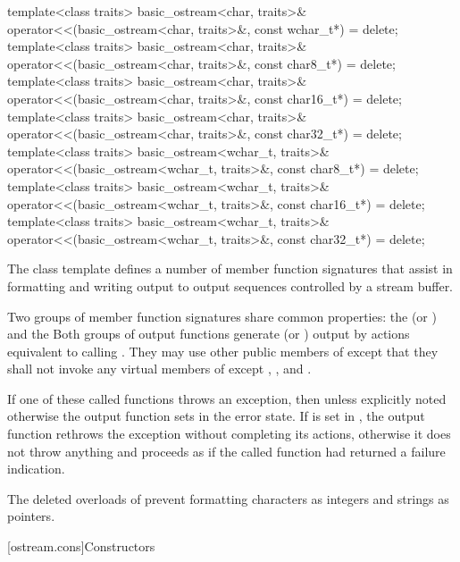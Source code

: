 \begin{codeblock}
{  template<class traits>
    basic_ostream<char, traits>&
      operator<<(basic_ostream<char, traits>&, const wchar_t*) = delete;
  template<class traits>
    basic_ostream<char, traits>&
      operator<<(basic_ostream<char, traits>&, const char8_t*) = delete;
  template<class traits>
    basic_ostream<char, traits>&
      operator<<(basic_ostream<char, traits>&, const char16_t*) = delete;
  template<class traits>
    basic_ostream<char, traits>&
      operator<<(basic_ostream<char, traits>&, const char32_t*) = delete;
  template<class traits>
    basic_ostream<wchar_t, traits>&
      operator<<(basic_ostream<wchar_t, traits>&, const char8_t*) = delete;
  template<class traits>
    basic_ostream<wchar_t, traits>&
      operator<<(basic_ostream<wchar_t, traits>&, const char16_t*) = delete;
  template<class traits>
    basic_ostream<wchar_t, traits>&
      operator<<(basic_ostream<wchar_t, traits>&, const char32_t*) = delete;
}
\end{codeblock}

\pnum
The class template
defines a number of member function
signatures that assist in formatting and writing output to output sequences
controlled by a stream buffer.

\pnum
Two groups of member function signatures share common properties:
the
(or
)
and the
Both groups of output functions generate (or
)
output
by actions equivalent to calling
.
They may use other public members of
except that they shall not invoke any virtual members of
except
,
,
and
.

\pnum
If one of these called functions throws an exception, then unless explicitly noted otherwise
the output function sets
in the error state.
If
is set in
,
the output function
rethrows the exception without completing its actions, otherwise
it does not throw anything and proceeds as if the called function had returned
a failure indication.

\pnum
\begin{note}
The deleted overloads of 
prevent formatting characters as integers and strings as pointers.
\end{note}

[ostream.cons]{Constructors}

